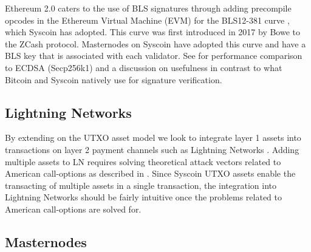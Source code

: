 \documentclass[peerreview]{ieeesyscoin}
\begin{document}
Ethereum 2.0 caters to the use of BLS signatures through adding precompile opcodes in the Ethereum Virtual Machine (EVM) for the BLS12-381 curve \cite{Dra18}, which Syscoin has adopted. This curve was first introduced in 2017 by Bowe \cite{Bow17}  to the ZCash protocol. Masternodes on Syscoin have adopted this curve and have a BLS key that is associated with each validator. See \cite{Blo18} for performance comparison to ECDSA (Secp256k1) and a discussion on usefulness in contrast to what Bitcoin and Syscoin natively use for signature verification.


\subsection{Lightning Networks}
By extending on the UTXO asset model we look to integrate layer 1 assets into transactions on layer 2 payment channels such as Lightning Networks \cite{Poon16}. Adding multiple assets to LN requires solving theoretical attack vectors related to American call-options as described in \cite{LN}. Since Syscoin UTXO assets enable the transacting of multiple assets in a single transaction, the integration into Lightning Networks should be fairly intuitive once the problems related to American call-options are solved for.

\subsection{Masternodes}
\end{document}
